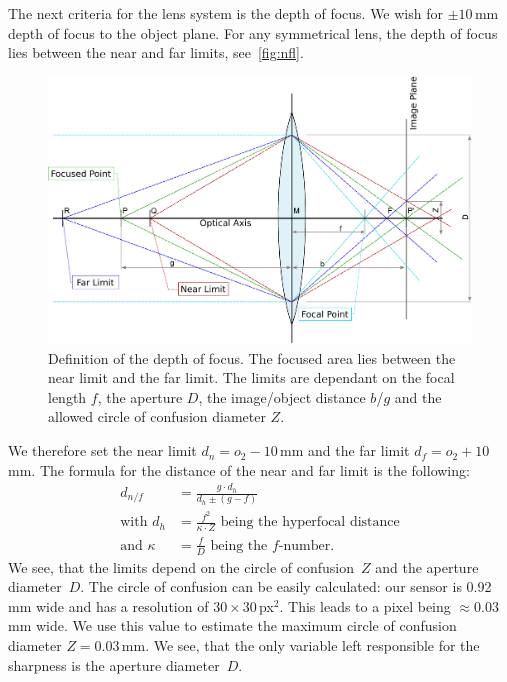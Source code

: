 \documentclass[12pt,a4paper]{article}
\begin{document}
The next criteria for the lens system is the depth of focus.
We wish for $\pm 10$\,mm depth of focus to the object plane.
For any symmetrical lens, the depth of focus lies between the near and far limits, see~\autoref{fig:nfl}.
\begin{figure}[htbp]
\begin{center}
\includegraphics[width=1\columnwidth]{figures/near_farpoints}
\caption{\label{fig:nfl}
Definition of the depth of focus.
The focused area lies between the near limit and the far limit.
The limits are dependant on the focal length $f$, the aperture $D$, the image/object distance $b$/$g$ and the allowed circle of confusion diameter $Z$.
}
\end{center}
\end{figure}
We therefore set the near limit $d_n = o_2 - 10$\,mm and the far limit $d_f = o_2 + 10$\,mm.
The formula for the distance of the near and far limit is the following: %
\begin{align}
\label{eq:nf}
d_{n/f} &= \frac{g \cdot d_h}{d_h \pm (g-f)} \\
\label{eq:hf}\text{with } d_h &= \frac{f^2}{\kappa \cdot Z} \text{ being the hyperfocal distance}\\
\label{eq:ka}\text{and } \kappa &= \frac{f}{D} \text{ being the $f$-number.}
\end{align}
We see, that the limits depend on the circle of confusion~$Z$ and the aperture diameter~$D$.
The circle of confusion can be easily calculated: our sensor is 0.92\,mm wide and has a resolution of $30 \times 30$\,px$^2$.
This leads to a pixel being $\approx 0.03$\,mm wide.
We use this value to estimate the maximum circle of confusion diameter $Z = 0.03$\,mm.
We see, that the only variable left responsible for the sharpness is the aperture diameter~$D$.
\end{document}
